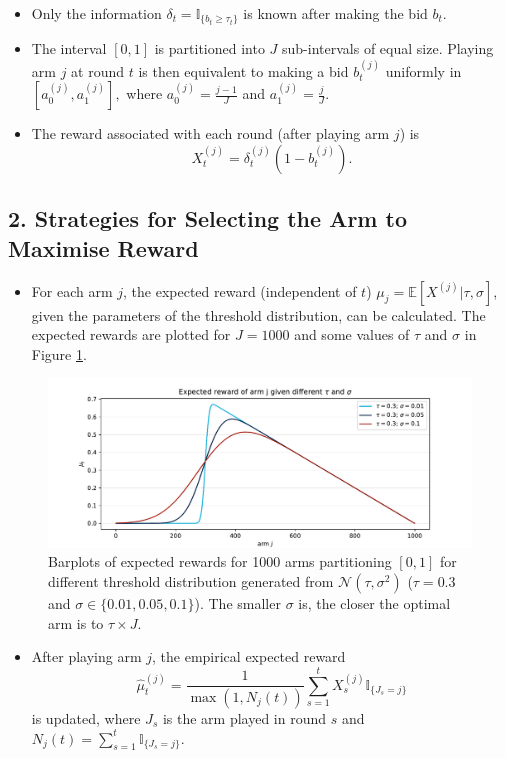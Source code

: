 \documentclass[
]{ImperialPoster}
\begin{document}
\begin{multicols}{2}
\begin{itemize}
		\item Only the information $\delta_{t} = \mathbb{I}_{\{b_{t} \geq \tau_{t}\}}$ is known after making the bid $b_t$.
		\item The interval $[0,1]$ is \textcolor{ICLBlue}{partitioned} into $J$ sub-intervals of equal size. Playing \textcolor{ICLBlue}{arm} $j$ at round $t$ is then equivalent to making a bid 
		$b_t^{(j)}$ uniformly in $\left[a_0^{(j)}, a_1^{(j)}\right],$ where $a_0^{(j)} = \frac{j-1}{J}$ and $a_1^{(j)} = \frac{j}{J}$.
		\item The \textcolor{ICLBlue}{reward} associated with each round (after playing arm $j$) is
		$$X_t^{(j)} = \delta_t^{(j)} (1 - b_t^{(j)}).$$
	\end{itemize}
    \subsection{2. Strategies for Selecting the Arm to Maximise Reward}
	
	\begin{itemize}
		\item For each arm $j$, the \textcolor{ICLBlue}{expected reward} (independent of $t$) $\mu_j = \mathbb{E}\left[X^{(j)}|\tau, \sigma\right]$, given the parameters of the threshold distribution, can be calculated. The expected rewards are plotted for 
		$J = 1000$ and some values of $\tau$ and $\sigma$ in Figure \ref{fig:exp_rew}.
	\end{itemize}

	\begin{figure}[H] %
		\includegraphics[width=\linewidth]{"../../../../figures/expect_rew.pdf"} %
		\caption{Barplots of expected rewards for 1000 arms partitioning $[0,1]$ for different threshold distribution generated from $\mathcal{N}(\tau, \sigma^2)$ ($\tau = 0.3$ and $\sigma \in \{0.01, 0.05, 0.1\}$).
		The smaller $\sigma$ is, the closer the optimal arm is to $\tau \times J$.}
		\label{fig:exp_rew}
	\end{figure}
	\begin{itemize}
		\item After playing arm $j$, the \textcolor{ICLBlue}{empirical expected reward} 
		$$\hat{\mu}^{(j)}_t = \frac{1}{\max\left(1,N_j(t)\right)}\sum_{s=1}^{t} X_{s}^{(j)} \mathbb{I}_{\{J_s = j\}}$$ is updated, where $J_s$ is the 
		arm played in round $s$ and $N_j(t) = \sum_{s=1}^{t}\mathbb{I}_{\{J_s = j\}}$.
	\end{itemize}


\end{multicols}
\end{document}
